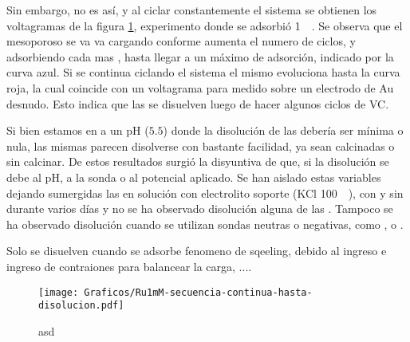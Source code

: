 		Sin embargo, no es así, y al ciclar constantemente el sistema se obtienen los voltagramas de la figura \ref{fig:diso_ru1mM}, experimento donde se adsorbió \ru\space \SI{1}{\milli\Molar}. Se observa que el mesoporoso se va va cargando conforme aumenta el numero de ciclos, y adsorbiendo cada mas \ru\space, hasta llegar a un máximo de adsorción, indicado por la curva azul. Si se continua ciclando el sistema el mismo evoluciona hasta la curva roja, la cual coincide con un voltagrama para \ru\space medido sobre un electrodo de Au desnudo. Esto indica que las \pdm\space se disuelven luego de hacer algunos ciclos de VC.

		Si bien estamos en a un pH ($5.5$) donde la disolución de las \pdm\space debería ser mínima o nula, las mismas parecen disolverse con bastante facilidad, ya sean \pdm\space calcinadas o sin calcinar. De estos resultados surgió la disyuntiva de que, si la disolución se debe al pH, a la sonda o al potencial aplicado. Se han aislado estas variables dejando sumergidas las \pdm en solución con electrolito soporte (KCl \SI{100}{\milli\Molar}), con y sin \ru\space durante varios días y no se ha observado disolución alguna de las \pdm. Tampoco se ha observado disolución cuando se utilizan sondas neutras o negativas, como \fc, \HQ o \fcn. 

		Solo se disuelven cuando se adsorbe \ru\space fenomeno de sqeeling, debido al ingreso e ingreso de contraiones para balancear la carga, ....


			\begin{figure}[ht]
				\centering
		 	    \texttt{[image: Graficos/Ru1mM-secuencia-continua-hasta-disolucion.pdf]}
		        \caption[asd]{asd}
		        \label{fig:diso_ru1mM}
		      	\end{figure} 

